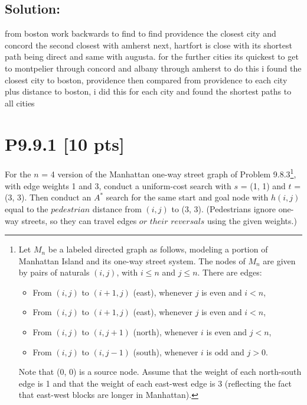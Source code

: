 \documentclass[12pt]{article}
\begin{document}
\subsection*{\textbf{Solution:}}

from boston work backwards to find to find providence the closest city and concord the second closest with amherst next, hartfort is close with its shortest path being direct and same with augusta. for the further cities its quickest to get to montpelier through concord and albany through amherst
to do this i found the closest city to boston, providence then compared from providence to each city plus distance to boston, i did this for each city and found the shortest paths to all cities
\newpage
\section*{\textbf{P9.9.1} [10 pts]}
 For the $n$ = 4 version of the Manhattan one-way street graph of Problem 9.8.3\footnote{ Let $M_n$ be a labeled directed graph as follows, modeling a portion of Manhattan Island and its one-way street system. The nodes of $M_n$ are given by pairs of naturals $(i, j)$, with $i \leq n$ and $j \leq n$. There are edges:
 \begin{itemize}
     \item From $(i, j)$ to $(i + 1, j)$ (east), whenever $j$ is even and $i < n$,

     \item From $(i, j)$ to $(i + 1, j)$ (east), whenever $j$ is even and $i < n$,

     \item From $(i, j)$ to $(i, j + 1)$ (north), whenever $i$ is even and $j < n$, 

     \item From $(i, j)$ to $(i, j - 1)$ (south), whenever $i$ is odd and $j > 0$.
     
 \end{itemize}
 Note that (0, 0) is a source node. Assume that the weight of each north-south edge is 1 and that the weight of each east-west edge is 3 (reflecting the fact that east-west blocks are longer in Manhattan).}, with edge weights 1 and 3, conduct a uniform-cost search with $s$ = (1, 1) and $t$ = (3, 3). Then conduct an $A^*$ search for the same start and goal node with $h(i, j)$ equal to the $pedestrian$ distance from $(i, j)$ to (3, 3). (Pedestrians ignore one-way streets, so they can travel edges $or$ $their$ $reversals$ using the given weights.)
\end{document}
